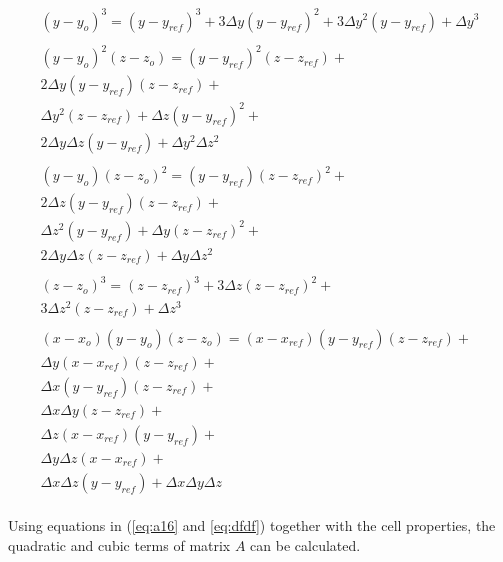 \begin{equation}
\begin{gathered}
\label{eq:dfdf}
    (y-y_o)^3=(y-y_{ref})^3+3\Delta y(y-y_{ref})^2+3\Delta y^2(y-y_{ref})+\Delta y^3\\
    \\
    (y-y_o)^2(z-z_o)=(y-y_{ref})^2(z-z_{ref})+\\2\Delta y(y-y_{ref})(z-z_{ref})+\\
    \Delta y^2(z-z_{ref})+\Delta z(y-y_{ref})^2+\\2\Delta y\Delta z(y-y_{ref})+\Delta y^2\Delta z^2\\
    \\
    (y-y_o)(z-z_o)^2=(y-y_{ref})(z-z_{ref})^2+\\2\Delta z(y-y_{ref})(z-z_{ref})+\\
    \Delta z^2 (y-y_{ref})+\Delta y (z-z_{ref})^2+\\2\Delta y\Delta z(z-z_{ref})+\Delta y \Delta z^2\\
    \\
    (z-z_o)^3=(z-z_{ref})^3+3\Delta z(z-z_{ref})^2+\\3\Delta z^2(z-z_{ref})+\Delta z^3\\
    \\
  (x-x_o)(y-y_o)(z-z_o)=(x-x_{ref})(y-y_{ref})(z-z_{ref})+\\
    \Delta y(x-x_{ref})(z-z_{ref})+\\
    \Delta x(y-y_{ref})(z-z_{ref})+\\\Delta x\Delta y(z-z_{ref})+\\
    \Delta z(x-x_{ref})(y-y_{ref})+\\\Delta y\Delta z(x-x_{ref})+\\
    \Delta x\Delta z(y-y_{ref})+\Delta x\Delta y\Delta z
 \end{gathered}
\end{equation}\\   
Using equations in (\ref{eq:a16} and \ref{eq:dfdf}) together with the cell properties, the quadratic and cubic terms of matrix $A$ can be calculated.

\newpage
